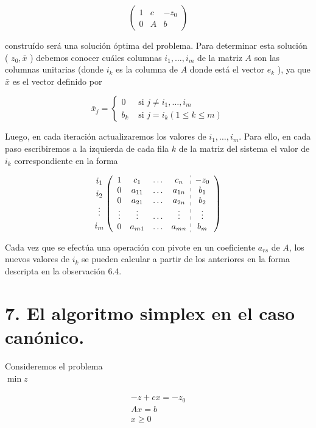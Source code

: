 \documentclass[10pt]{article}
\begin{document}
$$
\left(\begin{array}{cc|c}
1 & c & -z_{0} \\
0 & A & b
\end{array}\right)
$$

construído será una solución óptima del problema. Para determinar esta solución ( $z_{0}, \bar{x}$ ) debemos conocer cuáles columnas $i_{1}, \ldots, i_{m}$ de la matriz $A$ son las columnas unitarias (donde $i_{k}$ es la columna de $A$ donde está el vector $e_{k}$ ), ya que $\bar{x}$ es el vector definido por

$$
\bar{x}_{j}= \begin{cases}0 & \text { si } j \neq i_{1}, \ldots, i_{m} \\ b_{k} & \text { si } j=i_{k}(1 \leq k \leq m)\end{cases}
$$

Luego, en cada iteración actualizaremos los valores de $i_{1}, \ldots, i_{m}$. Para ello, en cada paso escribiremos a la izquierda de cada fila $k$ de la matriz del sistema el valor de $i_{k}$ correspondiente en la forma

$$
\begin{gathered}
i_{1} \\
i_{2} \\
\vdots \\
i_{m}
\end{gathered}\left(\begin{array}{cccc:c}
1 & c_{1} & \ldots & c_{n} & -z_{0} \\
0 & a_{11} & \ldots & a_{1 n} & b_{1} \\
0 & a_{21} & \ldots & a_{2 n} & b_{2} \\
\vdots & \vdots & \ldots & \vdots & \vdots \\
0 & a_{m 1} & \ldots & a_{m n} & b_{m}
\end{array}\right)
$$

Cada vez que se efectúa una operación con pivote en un coeficiente $a_{r s}$ de $A$, los nuevos valores de $i_{k}$ se pueden calcular a partir de los anteriores en la forma descripta en la observación 6.4.

\section*{7. El algoritmo simplex en el caso canónico.}
Consideremos el problema\\
$\min z$

$$
\begin{gathered}
-z+c x=-z_{0} \\
A x=b \\
x \geq 0
\end{gathered}
$$
\end{document}
